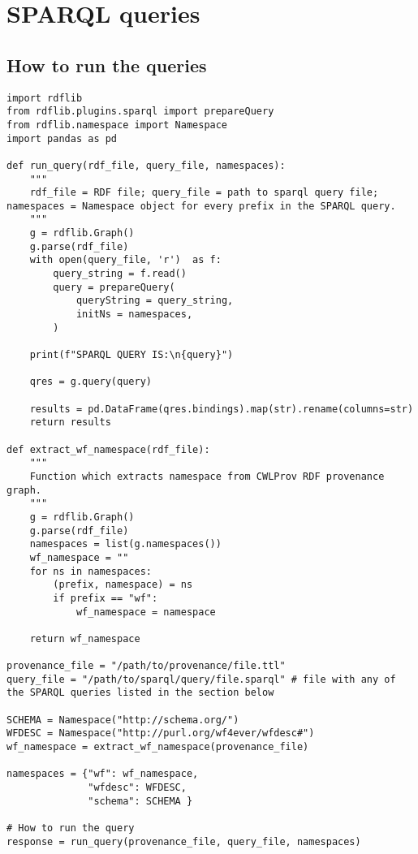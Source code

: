 \onecolumn
\section{SPARQL queries}
\label{sup:sparql}

\subsection{How to run the queries}

\begin{verbatim}
import rdflib
from rdflib.plugins.sparql import prepareQuery
from rdflib.namespace import Namespace
import pandas as pd

def run_query(rdf_file, query_file, namespaces):
    """
    rdf_file = RDF file; query_file = path to sparql query file; namespaces = Namespace object for every prefix in the SPARQL query.
    """
    g = rdflib.Graph()
    g.parse(rdf_file)
    with open(query_file, 'r')  as f:
        query_string = f.read()
        query = prepareQuery(
            queryString = query_string,
            initNs = namespaces,
        )

    print(f"SPARQL QUERY IS:\n{query}")
    
    qres = g.query(query)
    
    results = pd.DataFrame(qres.bindings).map(str).rename(columns=str)
    return results

def extract_wf_namespace(rdf_file):
    """
    Function which extracts namespace from CWLProv RDF provenance graph.
    """
    g = rdflib.Graph()
    g.parse(rdf_file)
    namespaces = list(g.namespaces())
    wf_namespace = ""
    for ns in namespaces:
        (prefix, namespace) = ns
        if prefix == "wf":
            wf_namespace = namespace

    return wf_namespace

provenance_file = "/path/to/provenance/file.ttl"
query_file = "/path/to/sparql/query/file.sparql" # file with any of the SPARQL queries listed in the section below

SCHEMA = Namespace("http://schema.org/")
WFDESC = Namespace("http://purl.org/wf4ever/wfdesc#")
wf_namespace = extract_wf_namespace(provenance_file)

namespaces = {"wf": wf_namespace, 
              "wfdesc": WFDESC,
              "schema": SCHEMA }

# How to run the query
response = run_query(provenance_file, query_file, namespaces)
\end{verbatim}

